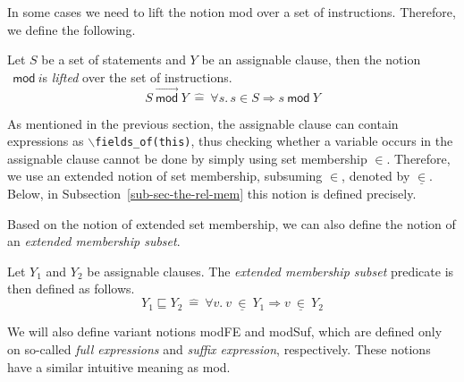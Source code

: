 \documentclass[a4paper]{llncs}
\newcommand{\defn}[1]{\:\hat{#1}\:}
\newcommand{\MOD}[2]{\ensuremath{\mathit{#1}\:\mathsf{mod}\:\ensuremath{\mathit{#2}}}}
\newcommand{\MODS}[2]{\ensuremath{\mathit{#1}\:\overrightarrow{\mathsf{mod}}\:\mathit{#2}}}
\newcommand{\extmember}[2]{\ensuremath{#1\: \underline\in\: #2}}
\newcommand{\extsubset}[2]{\ensuremath{#1 \sqsubseteq #2}}
\newcommand{\fieldsofarg}[1]{\texttt{\(\backslash\)fields\_of(#1)}}
\begin{document}
In some cases we need to lift the notion \textsf{mod} over a set of
instructions. Therefore, we define the following.

\begin{definition}
\label{def-mod-lis}
Let \(S\) be a set of statements and \(Y\) be an assignable clause,
then the notion \MOD\ is \emph{lifted} over the set of instructions.
\[\MODS{S}{Y} \defn{=}\forall s.\,s\in S\Rightarrow \MOD{s}{Y}\]
\end{definition}

As mentioned in the previous section, the assignable clause can
contain expressions as
\fieldsofarg{this}, thus checking whether a
variable occurs in the assignable clause cannot be done by simply using set
membership \(\in\). Therefore, we use an extended notion of set
membership, subsuming \(\in\), denoted by \(\underline\in\). Below, in 
Subsection~\ref{sub-sec-the-rel-mem} this notion is defined precisely.

Based on the notion of extended set membership, we can also define the
notion of an \emph{extended membership subset}.

\begin{definition}
\label{def-subseq}
Let \(Y_1\) and \(Y_2\) be assignable clauses. The \emph{extended
membership subset} predicate is then defined as follows.
\[\extsubset{Y_1}{Y_2} \defn{=} \forall v.\ \extmember{v}{Y_1}
\Rightarrow \extmember{v}{Y_2}\]
\end{definition} 


We will also define variant notions \textsf{modFE} and
\textsf{modSuf}, which are defined only on so-called \emph{full
expressions} and \emph{suffix expression}, respectively. 
These notions have a similar intuitive meaning as
\textsf{mod}. 
\end{document}
